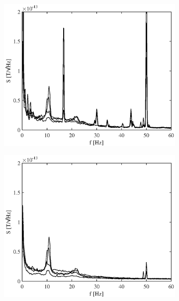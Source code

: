 \documentclass[doc,a4paper,12pt]{apa6}
\begin{document}
\begin{figure}
  \centering
  \captionsetup{justification=centering}
  \begin{subfigure}[c]{0.47\textwidth}
    \includegraphics[width=\textwidth]{ergebnisse/pa07a1_raw_freq.eps}
    \label{img:freq-analy-raw}
  \end{subfigure}\hspace*{0.04\textwidth}
  \begin{subfigure}[c]{0.47\textwidth}
    \includegraphics[width=\textwidth]{ergebnisse/pa07a1_sss_freq.eps}

\end{subfigure}
\end{figure}
\end{document}
